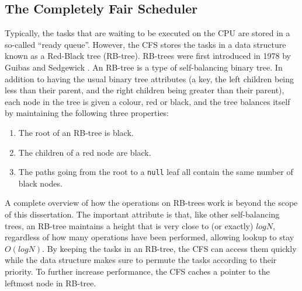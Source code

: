     \subsection{The Completely Fair Scheduler}
    Typically, the tasks that are waiting to be executed on the CPU are stored
    in a so-called ``ready queue''. However, the CFS stores the tasks in a
    data structure known as a Red-Black tree (RB-tree). RB-trees were first
    introduced in 1978 by Guibas and Sedgewick \cite{guibas_dichromatic_1978}.
    An RB-tree is a type of self-balancing binary tree. In addition to having
    the usual binary tree attributes (a key, the left children being less than
    their parent, and the right children being greater than their parent), each
    node in the tree is given a colour, red or black, and the tree balances
    itself by maintaining the following three properties:
    \begin{enumerate}
        \item The root of an RB-tree is black.
        \item The children of a red node are black.
        \item The paths going from the root to a \texttt{null} leaf all contain
              the same number of black nodes.
    \end{enumerate}
    A complete overview of how the operations on RB-trees work is beyond the
    scope of this dissertation. The important attribute is that, like other
    self-balancing trees, an RB-tree maintains a height that is very close to
    (or exactly) $log N$, regardless of how many operations have been performed,
    allowing lookup to stay $O(log N)$. By keeping the tasks in an RB-tree, the
    CFS can access them quickly while the data structure makes sure to permute
    the tasks according to their priority. To further increase performance, the
    CFS caches a pointer to the leftmost node in RB-tree.
    \\
    
